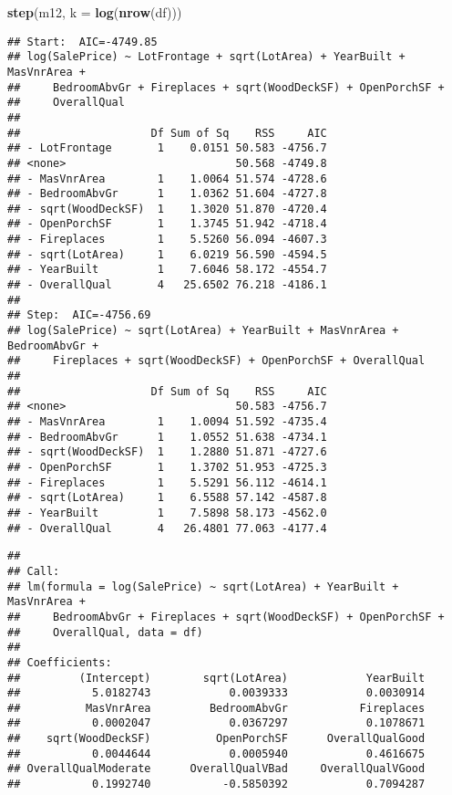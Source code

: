 \documentclass[
]{article}
\newenvironment{Shaded}{\begin{snugshade}}{\end{snugshade}}
\newcommand{\AttributeTok}[1]{\textcolor[rgb]{0.13,0.29,0.53}{#1}}
\newcommand{\FunctionTok}[1]{\textcolor[rgb]{0.13,0.29,0.53}{\textbf{#1}}}
\newcommand{\NormalTok}[1]{#1}
\begin{document}
\begin{Shaded}
\begin{Highlighting}[]
\FunctionTok{step}\NormalTok{(m12, }\AttributeTok{k =} \FunctionTok{log}\NormalTok{(}\FunctionTok{nrow}\NormalTok{(df)))}
\end{Highlighting}
\end{Shaded}

\begin{verbatim}
## Start:  AIC=-4749.85
## log(SalePrice) ~ LotFrontage + sqrt(LotArea) + YearBuilt + MasVnrArea + 
##     BedroomAbvGr + Fireplaces + sqrt(WoodDeckSF) + OpenPorchSF + 
##     OverallQual
## 
##                    Df Sum of Sq    RSS     AIC
## - LotFrontage       1    0.0151 50.583 -4756.7
## <none>                          50.568 -4749.8
## - MasVnrArea        1    1.0064 51.574 -4728.6
## - BedroomAbvGr      1    1.0362 51.604 -4727.8
## - sqrt(WoodDeckSF)  1    1.3020 51.870 -4720.4
## - OpenPorchSF       1    1.3745 51.942 -4718.4
## - Fireplaces        1    5.5260 56.094 -4607.3
## - sqrt(LotArea)     1    6.0219 56.590 -4594.5
## - YearBuilt         1    7.6046 58.172 -4554.7
## - OverallQual       4   25.6502 76.218 -4186.1
## 
## Step:  AIC=-4756.69
## log(SalePrice) ~ sqrt(LotArea) + YearBuilt + MasVnrArea + BedroomAbvGr + 
##     Fireplaces + sqrt(WoodDeckSF) + OpenPorchSF + OverallQual
## 
##                    Df Sum of Sq    RSS     AIC
## <none>                          50.583 -4756.7
## - MasVnrArea        1    1.0094 51.592 -4735.4
## - BedroomAbvGr      1    1.0552 51.638 -4734.1
## - sqrt(WoodDeckSF)  1    1.2880 51.871 -4727.6
## - OpenPorchSF       1    1.3702 51.953 -4725.3
## - Fireplaces        1    5.5291 56.112 -4614.1
## - sqrt(LotArea)     1    6.5588 57.142 -4587.8
## - YearBuilt         1    7.5898 58.173 -4562.0
## - OverallQual       4   26.4801 77.063 -4177.4
\end{verbatim}

\begin{verbatim}
## 
## Call:
## lm(formula = log(SalePrice) ~ sqrt(LotArea) + YearBuilt + MasVnrArea + 
##     BedroomAbvGr + Fireplaces + sqrt(WoodDeckSF) + OpenPorchSF + 
##     OverallQual, data = df)
## 
## Coefficients:
##         (Intercept)        sqrt(LotArea)            YearBuilt  
##           5.0182743            0.0039333            0.0030914  
##          MasVnrArea         BedroomAbvGr           Fireplaces  
##           0.0002047            0.0367297            0.1078671  
##    sqrt(WoodDeckSF)          OpenPorchSF      OverallQualGood  
##           0.0044644            0.0005940            0.4616675  
## OverallQualModerate      OverallQualVBad     OverallQualVGood  
##           0.1992740           -0.5850392            0.7094287
\end{verbatim}
\end{document}

